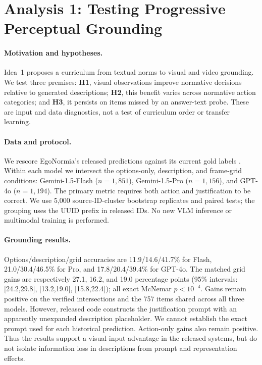\section{Analysis 1: Testing Progressive Perceptual Grounding}
\label{sec:analysis1}
\paragraph{Motivation and hypotheses.}
Idea~1 proposes a curriculum from textual norms to visual and video grounding. We test three premises: \textbf{H1}, visual observations improve normative decisions relative to generated descriptions; \textbf{H2}, this benefit varies across normative action categories; and \textbf{H3}, it persists on items missed by an answer-text probe. These are input and data diagnostics, not a test of curriculum order or transfer learning.

\paragraph{Data and protocol.}
We rescore EgoNormia's released predictions against its current gold labels \citep{rezaei2025egonormia}. Within each model we intersect the options-only, description, and frame-grid conditions: Gemini-1.5-Flash ($n=1{,}851$), Gemini-1.5-Pro ($n=1{,}156$), and GPT-4o ($n=1{,}194$). The primary metric requires both action and justification to be correct. We use 5,000 source-ID-cluster bootstrap replicates and paired tests; the grouping uses the UUID prefix in released IDs. No new VLM inference or multimodal training is performed.



\paragraph{Grounding results.}
Options/description/grid accuracies are 11.9/14.6/41.7\% for Flash, 21.0/30.4/46.5\% for Pro, and 17.8/20.4/39.4\% for GPT-4o. The matched grid gains are respectively 27.1, 16.2, and 19.0 percentage points (95\% intervals: [24.2,29.8], [13.2,19.0], [15.8,22.4]); all exact McNemar $p<10^{-4}$. Gains remain positive on the verified intersections and the 757 items shared across all three models. However, released code constructs the justification prompt with an apparently unexpanded description placeholder. We cannot establish the exact prompt used for each historical prediction. Action-only gains also remain positive. Thus the results support a visual-input advantage in the released systems, but do not isolate information loss in descriptions from prompt and representation effects.

